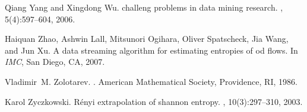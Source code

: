 \documentclass{sig-alternate}
\begin{document}
\begin{thebibliography}{10}
Qiang Yang and Xingdong Wu.
 challeng problems in data mining research.
, 5(4):597--604, 2006.

Haiquan Zhao, Ashwin Lall, Mitsunori Ogihara, Oliver Spatscheck, Jia Wang, and
  Jun Xu.
\newblock A data streaming algorithm for estimating entropies of od flows.
\newblock In {\em IMC}, San Diego, CA, 2007.

Vladimir~M. Zolotarev.
.
\newblock American Mathematical Society, Providence, RI, 1986.

Karol Zyczkowski.
\newblock R\'enyi extrapolation of shannon entropy.
, 10(3):297--310, 2003.

\end{thebibliography}
\end{document}

